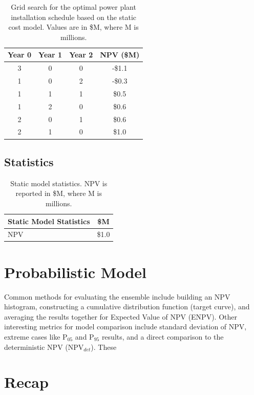 \begin{table}[!htp]%
\centering
\begin{tabular}{|c|c|c|c|}
\hline
\textbf{Year 0} & \textbf{Year 1} & \textbf{Year 2} & \textbf{NPV (\$M)} \\ \hline
3 & 0 & 0 & -\$1.1 \\ \hline
1 & 0 & 2 & -\$0.3 \\ \hline
1 & 1 & 1 & \$0.5 \\ \hline
1 & 2 & 0 & \$0.6 \\ \hline
2 & 0 & 1 & \$0.6 \\ \hline
2 & 1 & 0 & \$1.0 \\ \hline
\end{tabular}
\caption[Static model module installation schedule]{Grid search for the optimal power plant installation schedule based on the static cost model. Values are in \$M, where M is millions.}
\label{tab:static_optimization}
\end{table}

\subsection{Statistics}

\begin{table}[!htp]
\centering
\begin{tabular}{|l|c|}
\hline
\textbf{Static Model Statistics} & \textbf{\$M} \\ \hline
NPV & \$1.0 \\ \hline
\end{tabular}
\caption[Static model statistics]{Static model statistics. NPV is reported in \$M, where M is millions.}
\label{tab:static_mod_stats}
\end{table}

\section{Probabilistic Model}



Common methods for evaluating the ensemble include building an NPV histogram, constructing a cumulative distribution function (target curve), and averaging the results together for Expected Value of NPV (ENPV). Other interesting metrics for model comparison include standard deviation of NPV, extreme cases like P$_{05}$ and P$_{95}$ results, and a direct comparison to the deterministic NPV (NPV$_{det}$). These 



\section{Recap}